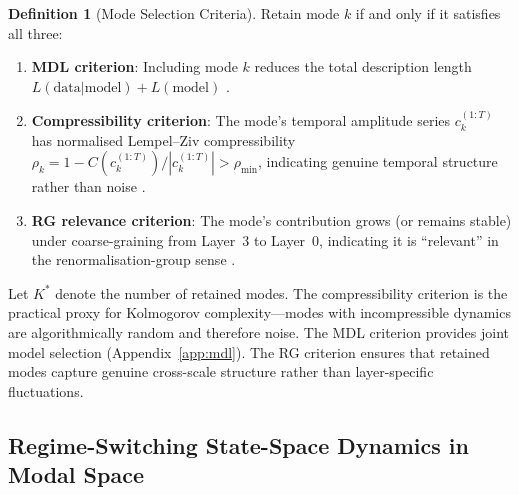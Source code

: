 \documentclass[11pt,a4paper]{article}
\theoremstyle{definition}
\newtheorem{definition}{Definition}[section]
\begin{document}
\begin{definition}[Mode Selection Criteria]
\label{def:mode_selection}
Retain mode $k$ if and only if it satisfies all three:
\begin{enumerate}[nosep]
  \item \textbf{MDL criterion}: Including mode $k$ reduces the total description length $L(\text{data}|\text{model}) + L(\text{model})$ \citep{rissanen1978modeling,grunwald2007minimum}.
  \item \textbf{Compressibility criterion}: The mode's temporal amplitude series $c_k^{(1:T)}$ has normalised Lempel--Ziv compressibility $\rho_k = 1 - C(c_k^{(1:T)})/|c_k^{(1:T)}| > \rho_{\min}$, indicating genuine temporal structure rather than noise \citep{lempel1976complexity}.
  \item \textbf{RG relevance criterion}: The mode's contribution grows (or remains stable) under coarse-graining from Layer~3 to Layer~0, indicating it is ``relevant'' in the renormalisation-group sense \citep{wilson1971renormalization}.
\end{enumerate}
\end{definition}

Let $K^*$ denote the number of retained modes. The compressibility criterion is the practical proxy for Kolmogorov complexity---modes with incompressible dynamics are algorithmically random and therefore noise. The MDL criterion provides joint model selection (Appendix~\ref{app:mdl}). The RG criterion ensures that retained modes capture genuine cross-scale structure rather than layer-specific fluctuations.

\subsection{Regime-Switching State-Space Dynamics in Modal Space}
\label{sec:kalman}
\end{document}
